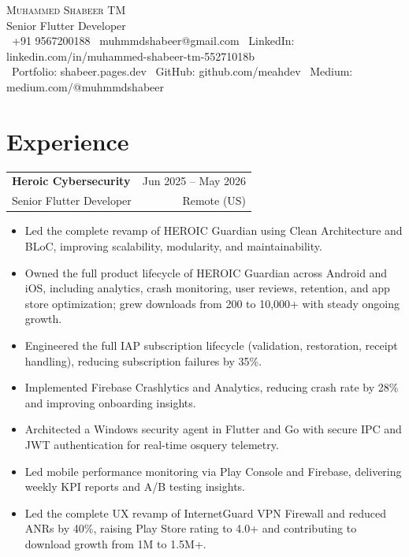 \documentclass[letterpaper,10pt]{article}
\makeatletter
\newcommand{\role}[4]{
  \vspace{2pt}
  \noindent\begin{tabular*}{\textwidth}{l@{\extracolsep{\fill}}r}
    \textbf{#1} & #2 \\
    #3 & #4 \\
  \end{tabular*}
  \vspace{-6pt}
}
\makeatother
\begin{document}
\mbox{}\vspace{15pt}

\begin{center}
    {\Huge \scshape Muhammed Shabeer TM}\\[4pt]
    {\small Senior Flutter Developer}\\[6pt]
    {\small
    \faPhone*\ +91 9567200188 \quad
    \faEnvelope\ muhmmdshabeer@gmail.com \quad
    \faLinkedin\ LinkedIn: linkedin.com/in/muhammed-shabeer-tm-55271018b\\[2pt]
    \faGlobe\ Portfolio: shabeer.pages.dev \quad
    \faGithub\ GitHub: github.com/meahdev \quad
    \faMedium\ Medium: medium.com/@muhmmdshabeer
    }
\end{center}

\vspace{-4pt}

\section*{Experience}

\role{Heroic Cybersecurity}{Jun 2025 -- May 2026}{Senior Flutter Developer}{Remote (US)}
\begin{itemize}
  \item Led the complete revamp of HEROIC Guardian using Clean Architecture and BLoC, improving scalability, modularity, and maintainability.
  \item Owned the full product lifecycle of HEROIC Guardian across Android and iOS, including analytics, crash monitoring, user reviews, retention, and app store optimization; grew downloads from 200 to 10,000+ with steady ongoing growth.
  \item Engineered the full IAP subscription lifecycle (validation, restoration, receipt handling), reducing subscription failures by 35\%.
  \item Implemented Firebase Crashlytics and Analytics, reducing crash rate by 28\% and improving onboarding insights.
  \item Architected a Windows security agent in Flutter and Go with secure IPC and JWT authentication for real-time osquery telemetry.
  \item Led mobile performance monitoring via Play Console and Firebase, delivering weekly KPI reports and A/B testing insights.
  \item Led the complete UX revamp of InternetGuard VPN Firewall and reduced ANRs by 40\%, raising Play Store rating to 4.0+ and contributing to download growth from 1M to 1.5M+.
\end{itemize}
\end{document}
